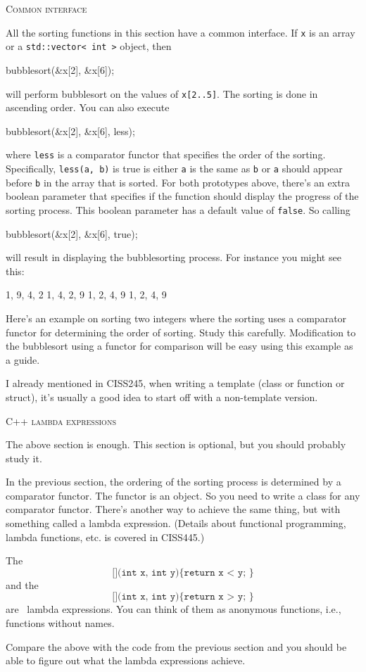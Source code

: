 \textsc{Common interface}

All the sorting functions in this section have a common interface.
If \verb!x! is an array or
a \verb!std::vector< int >! object, then
\begin{console}[fontsize=\footnotesize]
bubblesort(&x[2], &x[6]);
\end{console}
will perform bubblesort on the values of \verb!x[2..5]!.
The sorting is done in ascending order.
You can also execute
\begin{console}[fontsize=\footnotesize]
bubblesort(&x[2], &x[6], less);
\end{console}
where \verb!less! is a comparator functor that specifies the order of the
sorting.
Specifically, \verb!less(a, b)! is true is either \verb!a! is the same as
\verb!b! or \verb!a! should appear before \verb!b! in the array
that is sorted.
For both prototypes above, there's an extra boolean parameter that specifies
if the function should display the progress of the sorting process.
This boolean parameter has a default value of \verb!false!.
So calling
\begin{console}[fontsize=\footnotesize]
bubblesort(&x[2], &x[6], true);
\end{console}
will result in displaying the bubblesorting process.
For instance you might see this:
\begin{console}[fontsize=\footnotesize]
{1, 9, 4, 2}
{1, 4, 2, 9}
{1, 2, 4, 9}
{1, 2, 4, 9}
\end{console}

Here's an example on sorting two integers where the sorting uses
a comparator functor for determining the order of sorting.
Study this carefully.
Modification to the bubblesort using a functor for comparison will be easy
using this example as a guide.

I already mentioned in CISS245, when writing a template
(class or function or struct),
it's usually a good idea to start off with a non-template version.



\newpage
\textsc{C++ lambda expressions}

The above section is enough.
This section is optional, but you should probably study it.

In the previous section, the ordering of the sorting process
is determined by a comparator functor.
The functor is an object.
So you need to write a class for any comparator functor.
There's another way to achieve the same thing, but with
something called a lambda expression.
(Details about functional programming, lambda functions, etc. is covered
in CISS445.)


The
\[
\texttt{[](int x, int y)\{ return x < y; \}}
\]
and the
\[
\texttt{[](int x, int y)\{ return x > y; \}}
\]
are \cpp\ lambda expressions.
You can think of them as anonymous functions, i.e.,
functions without names.

Compare the above with the code from the previous section
and you should be able to figure out what the lambda expressions
achieve.
